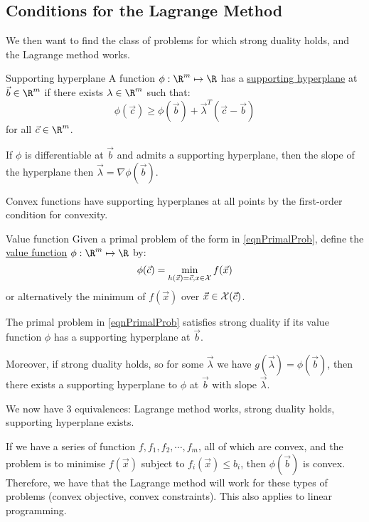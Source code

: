 \documentclass[../Main.tex]{subfiles}
\begin{document}
\subsection{Conditions for the Lagrange Method}
We then want to find the class of problems for which strong duality holds, and the Lagrange method works.
\begin{definition}{Supporting hyperplane}
    A function $\phi : \R^m \mapsto \R$ has a \underline{supporting hyperplane} at $\vec{b} \in \R^m$ if there exists $\lambda \in \R^m$ such that:
    \begin{equation}
        \phi(\vec{c}) \geq \phi(\vec{b}) + \vec{\lambda}^T (\vec{c} - \vec{b})
        \label{eqnSupportHyperPln}
    \end{equation}
    for all $\vec{c} \in \R^m$.
\end{definition}
\begin{remarks}
    \item If $\phi$ is differentiable at $\vec{b}$ and admits a supporting hyperplane, then the slope of the hyperplane then $\vec{\lambda} = \nabla \phi(\vec{b})$.
    \item Convex functions have supporting hyperplanes at all points by the first-order condition for convexity.
\end{remarks}
\begin{definition}{Value function}
    Given a primal problem of the form in \ref{eqnPrimalProb}, define the \underline{value function} $\phi : \R^m \mapsto \R$ by:
    \begin{equation*}
        \phi(\vec{c}) = \min_{h(\vec{x}) = \vec{c}, x \in \mathcal{X}} f(\vec{x})
    \end{equation*}
    or alternatively the minimum of $f(\vec{x})$ over $\vec{x} \in \mathcal{X}(\vec{c})$.
\end{definition}
\begin{theorem}
    The primal problem in \ref{eqnPrimalProb} satisfies strong duality if its value function $\phi$ has a supporting hyperplane at $\vec{b}$.

    Moreover, if strong duality holds, so for some $\vec{\lambda}$ we have $g(\vec{\lambda}) = \phi(\vec{b})$, then there exists a supporting hyperplane to $\phi$ at $\vec{b}$ with slope $\vec{\lambda}$.
    \label{thmSupportPlane}
\end{theorem}
\begin{remarks}
    \item We now have 3 equivalences: Lagrange method works, strong duality holds, supporting hyperplane exists.
    \item If we have a series of function $f, f_1, f_2, \cdots, f_m$, all of which are convex, and the problem is to minimise $f(\vec{x})$ subject to $f_i(\vec{x}) \leq b_i$, then $\phi(\vec{b})$ is convex. Therefore, we have that the Lagrange method will work for these types of problems (convex objective, convex constraints). This also applies to linear programming.
\end{remarks}
\end{document}
